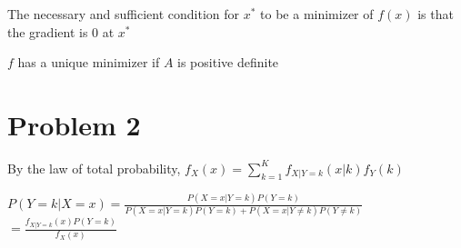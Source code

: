 \documentclass{article}
\begin{document}
\medskip

The necessary and sufficient condition for $x^*$ to be a minimizer of $f(x)$ is that the gradient is 0 at $x^*$

\medskip

$f$ has a unique minimizer if $A$ is positive definite

\section{Problem 2}

By the law of total probability, $ f_{X}(x) = \sum_{k=1}^K f_{X|Y=k}(x|k) f_Y(k)$

\medskip

$P(Y=k|X=x) = \frac{P(X=x|Y=k)P(Y=k)}{P(X=x|Y=k)P(Y=k)+P(X=x|Y\neq k)P(Y\neq k)}$
$=\frac{f_{X|Y=k}(x)P(Y=k)}{f_X(x)}$
\end{document}
